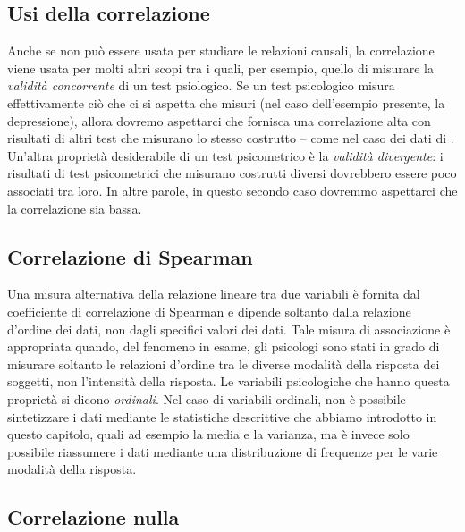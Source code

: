 \documentclass[
  10pt,
  italian,
  a4paper,
  extrafontsizes,onecolumn,openright
  ]{memoir}
\theoremstyle{definition}
\theoremstyle{definition}
\theoremstyle{definition}
\theoremstyle{definition}
\theoremstyle{remark}
\begin{document}
\hypertarget{usi-della-correlazione}{%
\subsection{Usi della correlazione}\label{usi-della-correlazione}}

Anche se non può essere usata per studiare le relazioni causali, la
correlazione viene usata per molti altri scopi tra i quali, per esempio,
quello di misurare la \emph{validità concorrente} di un test psiologico. Se
un test psicologico misura effettivamente ciò che ci si aspetta che
misuri (nel caso dell'esempio presente, la depressione), allora dovremo
aspettarci che fornisca una correlazione alta con risultati di altri
test che misurano lo stesso costrutto -- come nel caso dei dati di
\autocite{zetschefuture2019}. Un'altra proprietà desiderabile di un test
psicometrico è la \emph{validità divergente}: i risultati di test
psicometrici che misurano costrutti diversi dovrebbero essere poco
associati tra loro. In altre parole, in questo secondo caso dovremmo
aspettarci che la correlazione sia bassa.

\hypertarget{correlazione-di-spearman}{%
\subsection{Correlazione di Spearman}\label{correlazione-di-spearman}}

Una misura alternativa della relazione lineare tra due variabili è
fornita dal coefficiente di correlazione di Spearman e dipende soltanto
dalla relazione d'ordine dei dati, non dagli specifici valori dei dati.
Tale misura di associazione è appropriata quando, del fenomeno in esame,
gli psicologi sono stati in grado di misurare soltanto le relazioni
d'ordine tra le diverse modalità della risposta dei soggetti, non
l'intensità della risposta. Le variabili psicologiche che hanno questa
proprietà si dicono \emph{ordinali}. Nel caso di variabili ordinali, non è
possibile sintetizzare i dati mediante le statistiche descrittive che
abbiamo introdotto in questo capitolo, quali ad esempio la media e la
varianza, ma è invece solo possibile riassumere i dati mediante una
distribuzione di frequenze per le varie modalità della risposta.

\hypertarget{correlazione-nulla}{%
\subsection{Correlazione nulla}\label{correlazione-nulla}}
\end{document}
